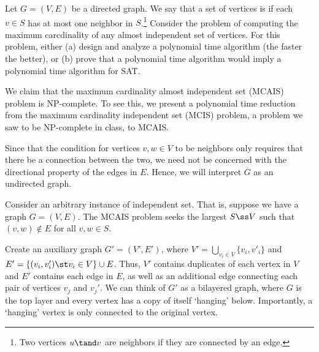 \documentclass{article}
\begin{document}
\setcounter{section}{13}
\setcounter{exercise}{3}
\begin{exercise}
Let $ G=(V,E) $ be a directed graph.
We say that a set of vertices is  if each $ v\in S $ has at most one neighbor in $ S $.\footnote[5]{Two vertices $u \tand v$ are neighbors if they are connected by an edge.}
Consider the problem of computing the maximum carcdinality of any almost independent set of vertices.
For this problem, either (a) design and analyze a polynomial time algorithm (the faster the better), or (b) prove that a polynomial time algorithm would imply a polynomial time algorithm for SAT.
\end{exercise}

\begin{solution}
  We claim that the maximum cardinality almost independent set (MCAIS) problem is NP-complete.
  To see this, we present a polynomial time reduction from the maximum cardinality independent set (MCIS) problem, a problem we saw to be NP-complete in class, to MCAIS.

  \begin{note}
    Since that the condition for vertices $ v,w\in V $ to be neighbors only requires that there be a connection between the two, we need not be concerned with the directional property of the edges in $ E $.
    Hence, we will interpret $ G $ as an undirected graph.
  \end{note}

  Consider an arbitrary instance of independent set.
  That is, suppose we have a graph $ G=(V,E) $.
  The MCAIS problem seeks the largest $ S\ss V $ such that $ (v,w)\not\in E $ for all $ v,w\in S $.

  Create an auxiliary graph $ G'=(V',E') $, where $ V'=\bigcup\limits_{v_i\in V}\{v_i,v'_i\} $ and $ E'=\{(v_i,v_i')\st v_i\in V\}\cup E $.
  Thus, $ V' $ contains duplicates of each vertex in $ V $ and $ E' $ contains each edge in $ E $, as well as an additional edge connecting each pair of vertices $ v_j $ and $ v_j' $.
  We can think of $ G' $ as a bilayered graph, where $ G $ is the top layer and every vertex has a copy of itself `hanging' below.
  Importantly, a `hanging' vertex is only connected to the original vertex.


\end{solution}
\end{document}
